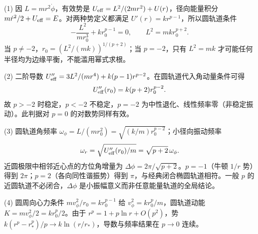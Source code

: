 (1) 因 \(L=mr^2\dot\phi\)，有效势是 \(U_{\rm eff}=L^2/(2mr^2)+U(r)\)，径向能量积分 \(m\dot r^2/2+U_{\rm eff}=E\)。对两种势定义都满足 \(U'(r)=kr^{p-1}\)，所以圆轨道条件
\[
-\frac{L^2}{mr_0^3}+kr_0^{p-1}=0,\qquad L^2=mk r_0^{p+2}.
\]
当 \(p\ne-2\)，\(r_0=(L^2/(mk))^{1/(p+2)}\)；当 \(p=-2\)，只有 \(L^2=mk\) 才可能任何半径均为边缘平衡，不能滥用幂式求根。

(2) 二阶导数 \(U_{\rm eff}''=3L^2/(mr^4)+k(p-1)r^{p-2}\)。在圆轨道代入角动量条件可得
\[
U_{\rm eff}''(r_0)=k(p+2)r_0^{p-2}.
\]
故 \(p>-2\) 时稳定，\(p<-2\) 不稳定，\(p=-2\) 为中性退化、线性频率零（非稳定振动）。此判据对 \(p=0\) 的对数势同样有效。

(3) 圆轨道角频率 \(\omega_\phi=L/(mr_0^2)=\sqrt{(k/m)r_0^{p-2}}\)；小径向振动频率
\[
\omega_r=\sqrt{U_{\rm eff}''(r_0)/m}=\sqrt{p+2}\,\omega_\phi.
\]
近圆极限中相邻近心点的方位角增量为 \(\Delta\phi=2\pi/\sqrt{p+2}\)。\(p=-1\)（牛顿 \(1/r\) 势）得到 \(2\pi\)；\(p=2\)（各向同性谐振势）得到 \(\pi\)，与经典闭合椭圆轨道相符。一般 \(p\) 的近圆轨道不必闭合，\(\Delta\phi\) 是小振幅意义而非任意能量轨道的全局结论。

(4) 圆周向心力条件 \(mv_\phi^2/r_0=kr_0^{p-1}\) 给 \(v_\phi^2=kr_0^p/m\)，圆轨道动能 \(K=mv_\phi^2/2=kr_0^p/2\)。由于 \(r^p=1+p\ln r+O(p^2)\)，势 \(k(r^p-r_*^p)/p\to k\ln(r/r_*)\)，导数与频率结果在 \(p\to0\) 连续。
